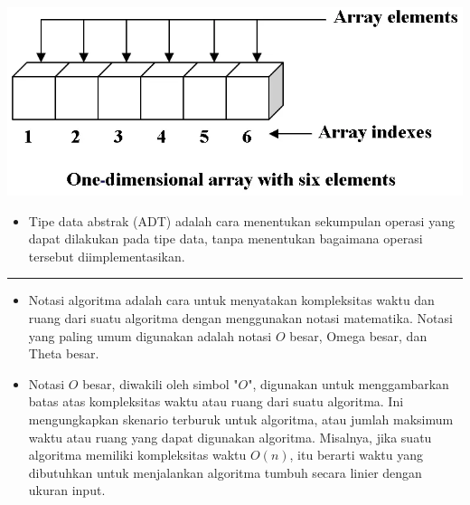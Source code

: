 \documentclass[12pt,preprintnumbers,amsmath,amssymb,nofootinbib,superscriptaddress]{revtex4-1}
\begin{document}
\begin{minipage}{0.6\textwidth}
    \includegraphics[width=\linewidth]{Figures/array.png}
\vspace{-2cm}

\end{minipage}
\begin{minipage}{0.39\textwidth}

\begin{itemize}
    \item Tipe data abstrak (ADT) adalah cara menentukan sekumpulan operasi yang dapat dilakukan pada tipe data, tanpa menentukan bagaimana operasi tersebut diimplementasikan.
\end{itemize}


\vspace{1cm}

\end{minipage}


\vspace{1cm}

\newpage

\label{Ueff}
\vspace{-0.7cm}
\vspace{-0.2cm}\hrule

\vspace{2cm}


\begin{itemize}
    \item Notasi algoritma adalah cara untuk menyatakan kompleksitas waktu dan ruang dari suatu algoritma dengan menggunakan notasi matematika. Notasi yang paling umum digunakan adalah notasi $O$ besar, Omega besar, dan Theta besar.
    \item Notasi $O$ besar, diwakili oleh simbol "$O$", digunakan untuk menggambarkan batas atas kompleksitas waktu atau ruang dari suatu algoritma. Ini mengungkapkan skenario terburuk untuk algoritma, atau jumlah maksimum waktu atau ruang yang dapat digunakan algoritma. Misalnya, jika suatu algoritma memiliki kompleksitas waktu $O(n)$, itu berarti waktu yang dibutuhkan untuk menjalankan algoritma tumbuh secara linier dengan ukuran input.
\end{itemize}
\end{document}
